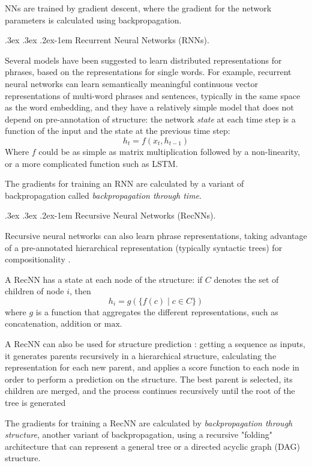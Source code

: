 \documentclass[11pt]{article}
\makeatletter
\renewcommand{\paragraph}{
  \@startsection{paragraph}{4}
  {\z@}{.3ex \@plus .3ex \@minus .2ex}{-1em}
  {\normalfont\normalsize\bfseries}
}
\makeatother
\begin{document}
NNs are trained by gradient descent, where the gradient for the network parameters
is calculated using backpropagation.

\paragraph{Recurrent Neural Networks (RNNs).}

Several models have been suggested to learn distributed representations for
phrases, based on the representations for single words.
For example, recurrent neural networks can learn semantically meaningful
continuous vector representations of multi-word phrases and sentences,
typically in the same space as the word embedding, and they have a relatively
simple model that does not depend on pre-annotation of structure:
the network \textit{state} at each time step is a function of the input and
the state at the previous time step:
\[
  h_t=f(x_t,h_{t-1})
\]
Where $f$ could be as simple as matrix multiplication followed by a non-linearity,
or a more complicated function such as LSTM.

The gradients for training an RNN are calculated by a variant of backpropagation
called \textit{backpropagation through time}.

\paragraph{Recursive Neural Networks (RecNNs).}

Recursive neural networks can also learn phrase representations, taking advantage
of a pre-annotated hierarchical representation (typically syntactic trees) for
compositionality \cite{socher2010learning}.

A RecNN has a state at each node of the structure: if $C$ denotes the set of children of
node $i$, then
\[
  h_i=g(\{f(c)\;|\;c\in C\})
\]
where $g$ is a function that aggregates the different representations, such as
concatenation, addition or $\mathrm{max}$.

A RecNN can also be used for structure prediction \cite{socher2013recursive}:
getting a sequence as inputs, it generates parents recursively in a
hierarchical structure, calculating the representation for each new parent, and applies
a score function to each node in order to perform a prediction on the
structure. The best parent is selected, its children are merged, and the
process continues recursively until the root of the tree is generated

The gradients for training a RecNN are calculated by \textit{backpropagation
through structure}, another variant of backpropagation, using a recursive
"folding" architecture that can represent a general tree or a directed acyclic
graph (DAG) structure\cite{goller1996learning}.
\end{document}
